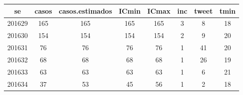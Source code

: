 \begin{tabular}{c|ccccccc}
  \hline
se & casos & casos.estimados & ICmin & ICmax & inc & tweet & tmin \\ 
  \hline
201629 & 165 & 165 & 165 & 165 & 3 & 8 & 18 \\ 
  201630 & 154 & 154 & 154 & 154 & 2 & 9 & 20 \\ 
  201631 & 76 & 76 & 76 & 76 & 1 & 41 & 20 \\ 
  201632 & 68 & 68 & 68 & 68 & 1 & 26 & 19 \\ 
  201633 & 63 & 63 & 63 & 63 & 1 & 6 & 21 \\ 
  201634 & 37 & 53 & 45 & 56 & 1 & 2 & 18 \\ 
   \hline
\end{tabular}
